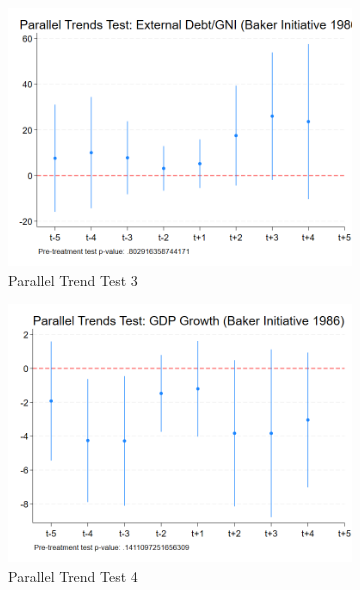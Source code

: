 \begin{figure}[ht!]
    \begin{subfigure}[b]{0.48\textwidth}
        \centering
        \includegraphics[width=\textwidth]{figures/PT_Baker_ExtDebt.png}
        \caption{Parallel Trend Test 3}
        \label{fig:pt3_eme}
    \end{subfigure}
    \hfill
    \begin{subfigure}[b]{0.48\textwidth}
        \centering
        \includegraphics[width=\textwidth]{figures/PT_Baker_GDP.png}
        \caption{Parallel Trend Test 4}
        \label{fig:pt4_eme}
    \end{subfigure}
    \\[1em]
    \begin{subfigure}[b]{0.48\textwidth}

\end{subfigure}
\end{figure}
